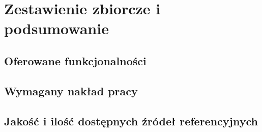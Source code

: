 \chapter{Zestawienie zbiorcze i podsumowanie}

\section{Oferowane funkcjonalności}
\section{Wymagany nakład pracy}
\section{Jakość i ilość dostępnych źródeł referencyjnych}